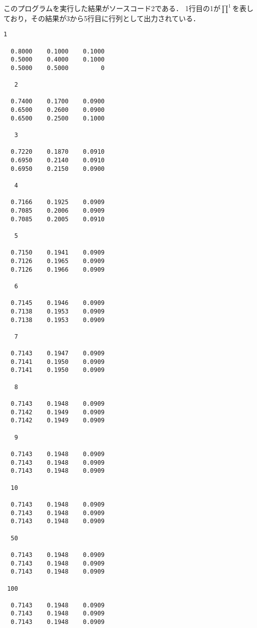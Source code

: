 \documentclass[documentclass]{jsarticle}
\begin{document}
このプログラムを実行した結果がソースコード2である．
1行目の1が$\prod^1$を表しており，その結果が3から5行目に行列として出力されている．

\begin{lstlisting}[caption=遷移確率行列を求めるプログラム]
  1

  0.8000    0.1000    0.1000
  0.5000    0.4000    0.1000
  0.5000    0.5000         0

   2

  0.7400    0.1700    0.0900
  0.6500    0.2600    0.0900
  0.6500    0.2500    0.1000

   3

  0.7220    0.1870    0.0910
  0.6950    0.2140    0.0910
  0.6950    0.2150    0.0900

   4

  0.7166    0.1925    0.0909
  0.7085    0.2006    0.0909
  0.7085    0.2005    0.0910

   5

  0.7150    0.1941    0.0909
  0.7126    0.1965    0.0909
  0.7126    0.1966    0.0909

   6

  0.7145    0.1946    0.0909
  0.7138    0.1953    0.0909
  0.7138    0.1953    0.0909

   7

  0.7143    0.1947    0.0909
  0.7141    0.1950    0.0909
  0.7141    0.1950    0.0909

   8

  0.7143    0.1948    0.0909
  0.7142    0.1949    0.0909
  0.7142    0.1949    0.0909

   9

  0.7143    0.1948    0.0909
  0.7143    0.1948    0.0909
  0.7143    0.1948    0.0909

  10

  0.7143    0.1948    0.0909
  0.7143    0.1948    0.0909
  0.7143    0.1948    0.0909

  50

  0.7143    0.1948    0.0909
  0.7143    0.1948    0.0909
  0.7143    0.1948    0.0909

 100

  0.7143    0.1948    0.0909
  0.7143    0.1948    0.0909
  0.7143    0.1948    0.0909
\end{lstlisting}
\end{document}
